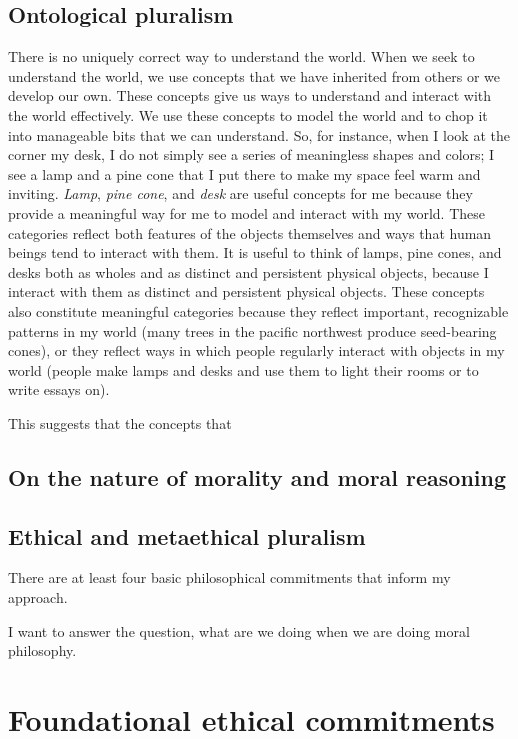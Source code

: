 \section{Ontological pluralism}
\label{sec:ont_plural}
There is no uniquely correct way to understand the world.
When we seek to understand the world, we use concepts that we have inherited
from others or we develop our own.
These concepts give us ways to understand and interact with the world
effectively.
We use these concepts to model the world and to chop it into manageable bits
that we can understand.
So, for instance, when I look at the corner my desk, I do not simply see a
series of meaningless shapes and colors; I see a lamp and a pine cone that I
put there to make my space feel warm and inviting.
\emph{Lamp}, \emph{pine cone}, and \emph{desk} are useful concepts for me because they
provide a meaningful way for me to model and interact with my world.
These categories reflect both features of the objects themselves and ways that
human beings tend to interact with them.
It is useful to think of lamps, pine cones, and desks both as wholes and as
distinct and persistent physical objects, because I interact with them as
distinct and persistent physical objects.
These concepts also constitute meaningful categories because they reflect
important, recognizable patterns in my world (many trees in the pacific
northwest produce seed-bearing cones), or they reflect ways in which people
regularly interact with objects in my world (people make lamps and desks and
use them to light their rooms or to write essays on).

This suggests that the concepts that 
\section{On the nature of morality and moral reasoning}
\label{sec:nat_mor}
\section{Ethical and metaethical pluralism}
\label{sec:eth_plur}
There are at least four basic philosophical commitments that inform my approach.

I want to answer the question, what are we doing when we are doing moral
philosophy.
\chapter{Foundational ethical commitments}
\label{ch:eth_com}
